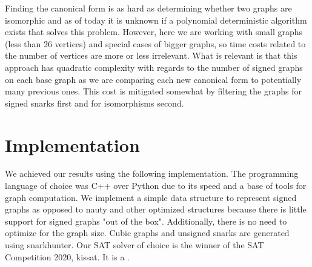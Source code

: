 Finding the canonical form is as hard as determining whether two graphs are isomorphic and as of today it is unknown if a polynomial deterministic algorithm exists that solves this problem. However, here we are working with small graphs (less than 26 vertices) and special cases of bigger graphs, so time costs related to the number of vertices are more or less irrelevant. What is relevant is that this approach has quadratic complexity with regards to the number of signed graphs on each base graph as we are comparing each new canonical form to potentially many previous ones. This cost is mitigated somewhat by filtering the graphs for signed snarks first and for isomorphisms second.

\section{Implementation}

We achieved our results using the following implementation. The programming language of choice was C++ over Python due to its speed and a base of tools for graph computation. We implement a simple data structure to represent signed graphs as opposed to nauty and other optimized structures because there is little support for signed graphs "out of the box". Additionally, there is no need to optimize for the graph size. Cubic graphs and unsigned snarks are generated using snarkhunter. Our SAT solver of choice is the winner of the SAT Competition 2020\cite{SAT-Competition-2020-solvers}, kissat. It is a .
